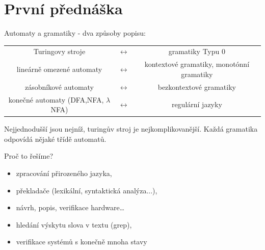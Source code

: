 \documentclass[../main.tex]{subfiles}
\begin{document}
\section{První přednáška}

\begin{remark}
    Automaty a gramatiky - dva způsoby popisu:

    \vspace{3mm}
    \begin{tabular} {c c c}
        Turingovy stroje & $\leftrightarrow$ & gramatiky Typu 0\\
        lineárně omezené automaty & $\leftrightarrow$ & kontextové gramatiky, monotónní gramatiky\\
        zásobníkové automaty & $\leftrightarrow$ & bezkontextové gramatiky\\
        konečné automaty (DFA,NFA, $\lambda$NFA) & $\leftrightarrow$ & regulární jazyky\\
    \end{tabular}

    \vspace{3mm}
    \noindent
    Nejjednodušší jsou nejníž, turingův stroj je nejkomplikovanější.
    Každá gramatika odpovídá nějaké třídě automatů.

    \vspace{3mm}
    \noindent
    Proč to řešíme?
    \begin{itemize}
        \item zpracování přirozeného jazyka,
        \item překladače (lexikální, syntaktická analýza...),
        \item návrh, popis, verifikace hardware\dots
        \item hledání výskytu slova v textu (grep),
        \item verifikace systémů s konečně mnoha stavy
    \end{itemize}
    


\end{remark}
\end{document}
